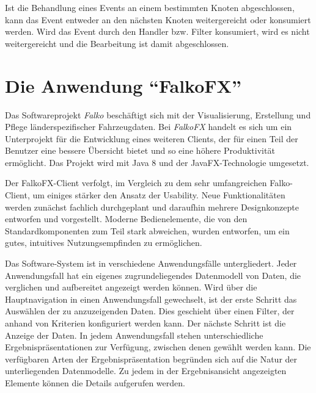 Ist die Behandlung eines Events an einem bestimmten Knoten abgeschlossen, kann das Event entweder an den nächsten Knoten weitergereicht oder konsumiert werden. Wird das Event durch den Handler bzw. Filter konsumiert, wird es nicht weitergereicht und die Bearbeitung ist damit abgeschlossen.\par
\section{Die Anwendung \enquote{FalkoFX}} \label{sec:application}
Das Softwareprojekt \textit{Falko} beschäftigt sich mit der Visualisierung, Erstellung und Pflege länderspezifischer Fahrzeugdaten. Bei \textit{FalkoFX} handelt es sich um ein Unterprojekt für die Entwicklung eines weiteren Clients, der für einen Teil der Benutzer eine bessere Übersicht bietet und so eine höhere Produktivität ermöglicht. Das Projekt wird mit Java 8 und der JavaFX-Technologie umgesetzt.\par
Der FalkoFX-Client verfolgt, im Vergleich zu dem sehr umfangreichen Falko-Client, um einiges stärker den Ansatz der Usability. Neue Funktionalitäten werden zunächst fachlich durchgeplant und daraufhin mehrere Designkonzepte entworfen und vorgestellt. Moderne Bedienelemente, die von den Standardkomponenten zum Teil stark abweichen, wurden entworfen, um ein gutes, intuitives Nutzungsempfinden zu ermöglichen.\par
Das Software-System ist in verschiedene Anwendungsfälle untergliedert. Jeder Anwendungsfall hat ein eigenes zugrundeliegendes Datenmodell von Daten, die verglichen und aufbereitet angezeigt werden können. Wird über die Hauptnavigation in einen Anwendungsfall gewechselt, ist der erste Schritt das Auswählen der zu anzuzeigenden Daten. Dies geschieht über einen Filter, der anhand von Kriterien konfiguriert werden kann. Der nächste Schritt ist die Anzeige der Daten. In jedem Anwendungsfall stehen unterschiedliche Ergebnispräsentationen zur Verfügung, zwischen denen gewählt werden kann. Die verfügbaren Arten der Ergebnispräsentation begründen sich auf die Natur der unterliegenden Datenmodelle. Zu jedem in der Ergebnisansicht angezeigten Elemente können die Details aufgerufen werden.\par
